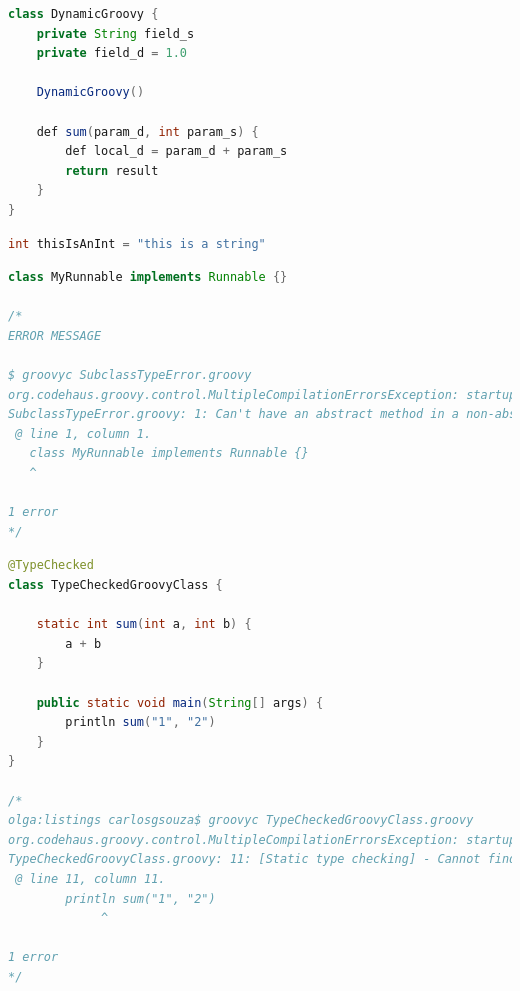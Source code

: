 \documentclass[preprint]{sigplanconf}
\begin{document}
\begin{Listing}[ht]
\begin{lstlisting}[language=Java,tabsize=2,breaklines=true]
class DynamicGroovy {
	private String field_s
	private field_d = 1.0

	DynamicGroovy()

	def sum(param_d, int param_s) {
		def local_d = param_d + param_s
		return result
	}
}
\end{lstlisting}
\caption{Groovy is a dynamic language}
\label{codigoGroovy}
\end{Listing}



\begin{Listing}[ht]
\begin{lstlisting}[language=Java,tabsize=2,breaklines=true]
int thisIsAnInt = "this is a string"
\end{lstlisting}
\caption{A class written in Groovy}
\label{codigoGroovy}
\end{Listing}



\begin{Listing}[ht]
\begin{lstlisting}[language=Java,tabsize=2,breaklines=true]
class MyRunnable implements Runnable {}

/*
ERROR MESSAGE

$ groovyc SubclassTypeError.groovy
org.codehaus.groovy.control.MultipleCompilationErrorsException: startup failed:
SubclassTypeError.groovy: 1: Can't have an abstract method in a non-abstract class. The class 'MyRunnable' must be declared abstract or the method 'void run()' must be implemented.
 @ line 1, column 1.
   class MyRunnable implements Runnable {}
   ^

1 error
*/

\end{lstlisting}
\caption{A class written in Groovy}
\label{codigoGroovy}
\end{Listing}



\begin{Listing}[ht]
\begin{lstlisting}[language=Java,tabsize=2,breaklines=true]
@TypeChecked
class TypeCheckedGroovyClass {
	
	static int sum(int a, int b) {
		a + b
	}

	public static void main(String[] args) {
		println sum("1", "2")
	}
}

/*
olga:listings carlosgsouza$ groovyc TypeCheckedGroovyClass.groovy
org.codehaus.groovy.control.MultipleCompilationErrorsException: startup failed:
TypeCheckedGroovyClass.groovy: 11: [Static type checking] - Cannot find matching method TypeCheckedGroovyClass#sum(java.lang.String, java.lang.String). Please check if the declared type is right and if the method exists.
 @ line 11, column 11.
   		println sum("1", "2")
             ^

1 error
*/
\end{lstlisting}
\caption{A class written in Groovy}
\label{codigoGroovy}
\end{Listing}
\end{document}
